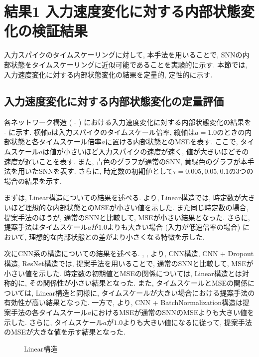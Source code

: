
\section{結果1 入力速度変化に対する内部状態変化の検証結果} \label{sec:result1}
入力スパイクのタイムスケーリングに対して, 本手法を用いることで, SNNの内部状態をタイムスケーリングに近似可能であることを実験的に示す.
本節では, 入力速度変化に対する内部状態変化の結果を定量的, 定性的に示す.

\subsection{入力速度変化に対する内部状態変化の定量評価}
各ネットワーク構造 ( - ) における入力速度変化に対する内部状態変化の結果を -  に示す.
横軸$a$は入力スパイクのタイムスケール倍率, 縦軸は$a=1.0$のときの内部状態と各タイムスケール倍率$a$に置ける内部状態とのMSEを表す.
ここで, タイムスケール$a$は値が小さいほど入力スパイクの速度が速く, 値が大きいほどその速度が遅いことを表す.
また, 青色のグラフが通常のSNN, 黄緑色のグラフが本手法を用いたSNNを表す.
さらに, 時定数の初期値として$\tau=0.005, 0.05, 0.1$の3つの場合の結果を示す.

まずは, Linear構造についての結果を述べる.
より, Linear構造では, 時定数が大きいほど理想的な内部状態とのMSEが小さい値を示した.
また同じ時定数の場合, 提案手法のほうが, 通常のSNNと比較して, MSEが小さい結果となった.
さらに, 提案手法はタイムスケール$a$が$1.0$よりも大きい場合 (入力が低速倍率の場合) において, 理想的な内部状態との差がより小さくなる特徴を示した.

次にCNN系の構造についての結果を述べる.
, , より, CNN構造, CNN + Dropout構造, ResNet構造では, 提案手法を用いることで, 通常のSNNと比較して, MSEが小さい値を示した.
時定数の初期値とMSEの関係については, Linear構造とは対称的に, その関係性が小さい結果となった.
また, タイムスケールとMSEの関係については, Linear構造と同様に, タイムスケールが大きい場合における提案手法の有効性が高い結果となった.
一方で, より, CNN + BatchNormalization構造は提案手法の各タイムスケール$a$におけるMSEが通常のSNNのMSEよりも大きい値を示した.
さらに, タイムスケール$a$が$1.0$よりも大きい値になるに従って, 提案手法のMSEが大きな値を示す結果となった.
\begin{figure}[htb]
    \centering
    
    \caption{Linear構造}
    \label{fig:result1:1:linear}
\end{figure}

